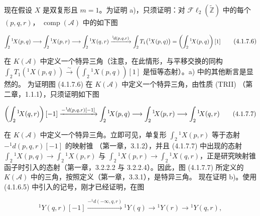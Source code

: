 \clearpage
{}%
\begingroup\small\setlength{\parskip}{0pt}\setlength{\emergencystretch}{1.5em}
\setlength{\abovedisplayskip}{4pt plus 2pt minus 2pt}%
\setlength{\belowdisplayskip}{4pt plus 2pt minus 2pt}%

现在假设 $X$ 是双复形且 $m=1$。为证明 a)，只须证明：对
$\mathcal{F}\ell_2(\widetilde{\mathbb Z})$ 中的每个 $(p,q,r)$，
$\operatorname{comp}(\mathcal A)$ 中的如下图

\begin{equation}
\resizebox{0.98\linewidth}{!}{$
\displaystyle
\int_2{}^{1}\!X(p,q)\longrightarrow
\int_2{}^{1}\!X(p,r)\longrightarrow
\int_2{}^{1}\!X(q,r)
\xrightarrow{{}^{1}\!d(p,q,r)}
\int_2T_1\bigl({}^{1}\!X(p,q)\bigr)
=\left(\int_2{}^{1}\!X(p,q)\right)[1]
$}
\tag{4.1.7.6}
\end{equation}

在 $K(\mathcal A)$ 中定义一个特异三角（注意，在此情形，与平移交换的同构
$\int_2T_1({}^{1}\!X(p,q))\xrightarrow{\sim}
(\int_2{}^{1}\!X(p,q))[1]$ 是恒等态射）。a) 中的其他断言是显然的。
为证明图 (4.1.7.6) 在 $K(\mathcal A)$ 中定义一个特异三角，由性质 (TRII)
（第二章，1.1.1），只须证明如下图

\begin{equation}
\resizebox{0.96\linewidth}{!}{$
\displaystyle
\left(\int_2{}^{1}\!X(q,r)\right)[-1]
\xrightarrow{-{}^{1}\!d(p,q,r)[-1]}
\int_2{}^{1}\!X(p,q)\longrightarrow
\int_2{}^{1}\!X(p,r)\longrightarrow
\int_2{}^{1}\!X(q,r)
$}
\tag{4.1.7.7}
\end{equation}

在 $K(\mathcal A)$ 中定义一个特异三角。立即可见，单复形
$\int_2{}^{1}\!X(p,r)$ 等于态射 $-{}^{1}\!d(p,q,r)[-1]$ 的映射锥
（第一章，3.1.2），并且 (4.1.7.7) 中出现的态射
$\int_2{}^{1}\!X(p,q)\longrightarrow\int_2{}^{1}\!X(p,r)$ 与
$\int_2{}^{1}\!X(p,r)\longrightarrow\int_2{}^{1}\!X(q,r)$，正是研究映射锥
函子时引入的态射（第一章，3.2.2.2 与 3.2.2.4）。因此，图 (4.1.7.7)
所定义的 $K(\mathcal A)$ 中的三角，按照定义（第一章，3.3.1），是特异三角。
现在证明 b)。使用 (4.1.6.5) 中引入的记号，刚才已经证明，在图

\begin{equation}
{}^{1}\!Y(q,r)[-1]
\xrightarrow{-{}^{1}\!d(-\infty,q,r)}
{}^{1}\!Y(q)\longrightarrow{}^{1}\!Y(r)\longrightarrow{}^{1}\!Y(q,r),
\tag{4.1.7.8}
\end{equation}


